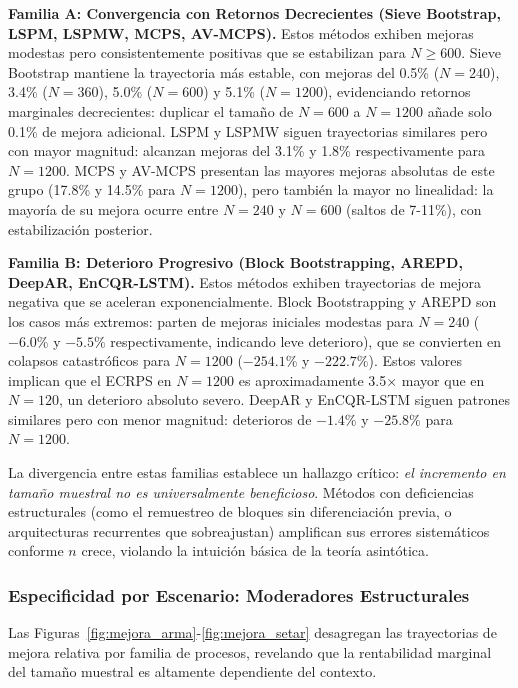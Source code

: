\textbf{Familia A: Convergencia con Retornos Decrecientes (Sieve Bootstrap, LSPM, LSPMW, MCPS, AV-MCPS).} Estos métodos exhiben mejoras modestas pero consistentemente positivas que se estabilizan para $N \geq 600$. Sieve Bootstrap mantiene la trayectoria más estable, con mejoras del 0.5\% ($N = 240$), 3.4\% ($N = 360$), 5.0\% ($N = 600$) y 5.1\% ($N = 1200$), evidenciando retornos marginales decrecientes: duplicar el tamaño de $N = 600$ a $N = 1200$ añade solo 0.1\% de mejora adicional. LSPM y LSPMW siguen trayectorias similares pero con mayor magnitud: alcanzan mejoras del 3.1\% y 1.8\% respectivamente para $N = 1200$. MCPS y AV-MCPS presentan las mayores mejoras absolutas de este grupo (17.8\% y 14.5\% para $N = 1200$), pero también la mayor no linealidad: la mayoría de su mejora ocurre entre $N = 240$ y $N = 600$ (saltos de 7-11\%), con estabilización posterior.

\textbf{Familia B: Deterioro Progresivo (Block Bootstrapping, AREPD, DeepAR, EnCQR-LSTM).} Estos métodos exhiben trayectorias de mejora negativa que se aceleran exponencialmente. Block Bootstrapping y AREPD son los casos más extremos: parten de mejoras iniciales modestas para $N = 240$ ($-6.0\%$ y $-5.5\%$ respectivamente, indicando leve deterioro), que se convierten en colapsos catastróficos para $N = 1200$ ($-254.1\%$ y $-222.7\%$). Estos valores implican que el ECRPS en $N = 1200$ es aproximadamente 3.5× mayor que en $N = 120$, un deterioro absoluto severo. DeepAR y EnCQR-LSTM siguen patrones similares pero con menor magnitud: deterioros de $-1.4\%$ y $-25.8\%$ para $N = 1200$. 

La divergencia entre estas familias establece un hallazgo crítico: \textit{el incremento en tamaño muestral no es universalmente beneficioso}. Métodos con deficiencias estructurales (como el remuestreo de bloques sin diferenciación previa, o arquitecturas recurrentes que sobreajustan) amplifican sus errores sistemáticos conforme $n$ crece, violando la intuición básica de la teoría asintótica.

\subsubsection{Especificidad por Escenario: Moderadores Estructurales}

Las Figuras~\ref{fig:mejora_arma}-\ref{fig:mejora_setar} desagregan las trayectorias de mejora relativa por familia de procesos, revelando que la rentabilidad marginal del tamaño muestral es altamente dependiente del contexto.


